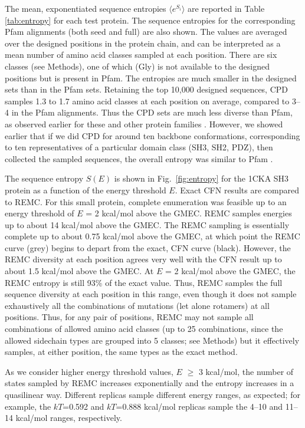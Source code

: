 \documentclass[a4paper,12pt]{article}
\begin{document}
The mean, exponentiated sequence entropies $\langle e^{S_i}\rangle$ are reported in Table \ref{tab:entropy} for each
test protein. The sequence entropies for the corresponding Pfam alignments (both seed and full) are also shown. The
values are averaged over the designed positions in the protein chain, and can be interpreted as a mean number of amino
acid classes sampled at each position. There are six classes (see Methods), one of which (Gly) is not available to the
designed positions but is present in Pfam. The entropies are much smaller in the designed sets than in the Pfam sets.
Retaining the top 10,000 designed sequences, CPD samples 1.3 to 1.7 amino acid classes at each position on average,
compared to 3--4 in the Pfam alignments. Thus the CPD sets are much less diverse than Pfam, as observed earlier for
these and other protein families \cite{Schmidt09,Schmidt10}. However, we showed earlier that if we did CPD for around
ten backbone conformations, corresponding to ten representatives of a particular domain class (SH3, SH2, PDZ), then
collected the sampled sequences, the overall entropy was similar to Pfam \cite{Schmidt09,Schmidt10}. 

The sequence entropy $S(E)$ is shown in Fig.\ \ref{fig:entropy} for the 1CKA SH3 protein as a function of the energy
threshold $E$. Exact CFN results are compared to REMC. For this small protein, complete enumeration was feasible up to
an energy threshold of $E$ = 2 kcal/mol above the GMEC. REMC samples energies up to about 14 kcal/mol above the GMEC.
The REMC sampling is essentially complete up to about 0.75 kcal/mol above the GMEC, at which point the REMC curve (grey)
begins to depart from the exact, CFN curve (black). However, the REMC diversity at each position agrees very well with
the CFN result up to about 1.5 kcal/mol above the GMEC. At $E$ = 2 kcal/mol above the GMEC, the REMC entropy is still
93\% of the exact value. Thus, REMC samples the full sequence diversity at each position in this range, even though it
does not sample exhaustively all the combinations of mutations (let alone rotamers) at all positions. Thus, for any
pair of positions, REMC may not sample all combinations of allowed amino acid classes (up to 25 combinations, since
the allowed sidechain types are grouped into 5 classes; see Methods) but it effectively samples, at either position,
the same types as the exact method.

As we consider higher energy threshold values, $E$ $\ge$ 3 kcal/mol, the number of states sampled by REMC increases
exponentially and the entropy increases in a quasilinear way. Different replicas sample different energy ranges, as
expected; for example, the $kT$=0.592 and $kT$=0.888 kcal/mol replicas sample the 4--10 and 11--14 kcal/mol ranges, 
respectively. 
\end{document}
